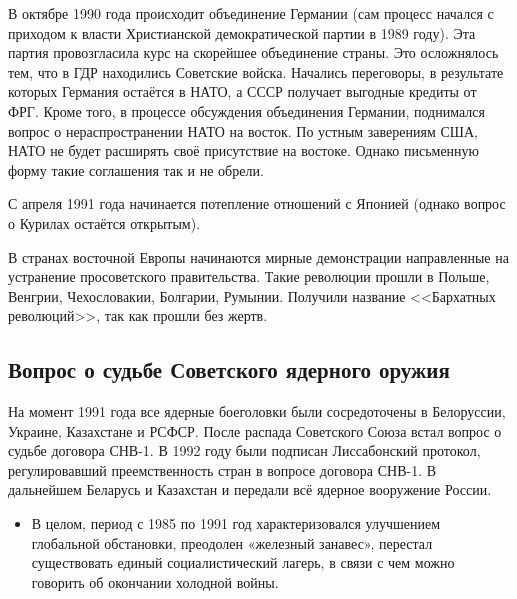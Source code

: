 В октябре 1990 года происходит объединение Германии (сам процесс начался с приходом к власти Христианской демократической партии в 1989 году). Эта партия провозгласила курс на скорейшее объединение страны. Это осложнялось тем, что в ГДР находились Советские войска. Начались переговоры, в результате которых Германия остаётся в НАТО, а СССР получает выгодные кредиты от ФРГ. Кроме того, в процессе обсуждения объединения Германии, поднимался вопрос о нераспространении НАТО на восток. По устным заверениям США, НАТО не будет расширять своё присутствие на востоке. Однако письменную форму такие соглашения так и не обрели. 

С апреля 1991 года начинается потепление отношений с Японией (однако вопрос о Курилах остаётся открытым). 

В странах восточной Европы начинаются мирные демонстрации направленные на устранение просоветского правительства. Такие революции прошли в Польше, Венгрии, Чехословакии, Болгарии, Румынии. Получили название <<Бархатных революций>>, так как прошли без жертв.

\subsection{Вопрос о судьбе Советского ядерного оружия}

На момент 1991 года все ядерные боеголовки были сосредоточены в Белоруссии, Украине, Казахстане и РСФСР. После распада Советского Союза встал вопрос о судьбе договора СНВ-1. В 1992 году были подписан Лиссабонский протокол, регулировавший преемственность стран в вопросе договора СНВ-1. В дальнейшем Беларусь и Казахстан и передали всё ядерное вооружение России. 

\vspace{0.5cm}
\begin{itemize}
    \item[] В целом, период с 1985 по 1991 год характеризовался улучшением глобальной обстановки, преодолен «железный занавес», перестал существовать единый социалистический лагерь, в связи с чем можно говорить об окончании холодной войны. 
\end{itemize}
